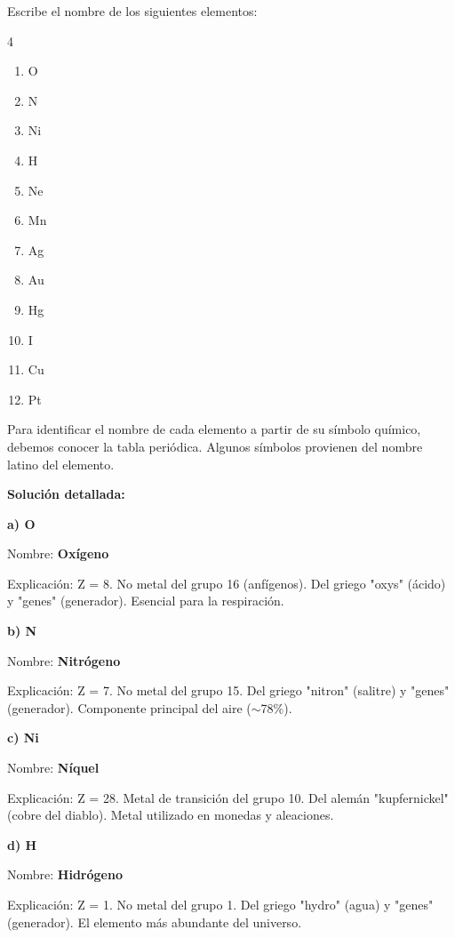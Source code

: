 \begin{exercise}
    Escribe el nombre de los siguientes elementos:
    \begin{multicols}{4}
        \begin{enumerate}[label=\letraminuscula]
        \item O
        \item N
        \item Ni
        \item H
        \item Ne
        \item Mn
        \item Ag
        \item Au
        \item Hg
        \item I
        \item Cu
        \item Pt
        \end{enumerate}
    \end{multicols}
    \begin{solu}
        Para identificar el nombre de cada elemento a partir de su símbolo químico, debemos conocer la tabla periódica. Algunos símbolos provienen del nombre latino del elemento.

        \textbf{Solución detallada:}

        \textbf{a) O}

        Nombre: \textbf{Oxígeno}

        Explicación: Z = 8. No metal del grupo 16 (anfígenos). Del griego "oxys" (ácido) y "genes" (generador). Esencial para la respiración.

        \textbf{b) N}

        Nombre: \textbf{Nitrógeno}

        Explicación: Z = 7. No metal del grupo 15. Del griego "nitron" (salitre) y "genes" (generador). Componente principal del aire (\(\sim\)78\%).

        \textbf{c) Ni}

        Nombre: \textbf{Níquel}

        Explicación: Z = 28. Metal de transición del grupo 10. Del alemán "kupfernickel" (cobre del diablo). Metal utilizado en monedas y aleaciones.

        \textbf{d) H}

        Nombre: \textbf{Hidrógeno}

        Explicación: Z = 1. No metal del grupo 1. Del griego "hydro" (agua) y "genes" (generador). El elemento más abundante del universo.


\end{solu}
\end{exercise}
